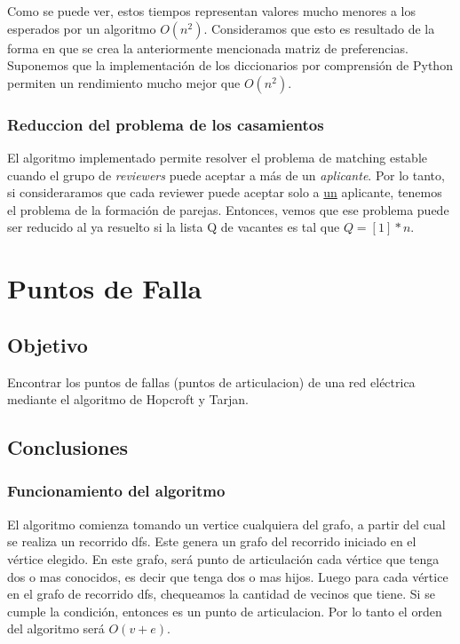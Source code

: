\documentclass{article}
\begin{document}
                Como se puede ver, estos tiempos representan valores mucho menores a
                los esperados por un algoritmo $O(n^2)$. Consideramos que esto es
                resultado de la forma en que se crea la anteriormente mencionada
                matriz de preferencias. Suponemos que la implementación de los
                diccionarios por comprensión de Python permiten un rendimiento mucho
                mejor que $O(n^2)$.
            \subsubsection{Reduccion del problema de los casamientos}
                El algoritmo implementado permite resolver el problema de matching
                estable cuando el grupo de \emph{reviewers} puede aceptar a más de
                un \emph{aplicante}. Por lo tanto, si consideraramos que cada reviewer
                puede aceptar solo a \underline{un} aplicante, tenemos el problema
                de la formación de parejas. Entonces, vemos que ese problema
                puede ser reducido al ya resuelto si la lista Q de vacantes es tal
                que $Q = [1]*n$.

    \section{Puntos de Falla}
        \subsection{Objetivo}
            Encontrar los puntos de fallas (puntos de articulacion) de una red eléctrica
            mediante el algoritmo de Hopcroft y Tarjan.
        \subsection{Conclusiones}
            \subsubsection{Funcionamiento del algoritmo}
                El algoritmo comienza tomando un vertice cualquiera del grafo, a partir
                del cual se realiza un recorrido dfs. Este genera un grafo del recorrido
                iniciado en el vértice elegido. En este grafo, será punto de articulación
                cada vértice que tenga dos o mas conocidos, es decir que tenga dos o mas
                hijos. Luego para cada vértice en el grafo de recorrido dfs, chequeamos
                la cantidad de vecinos que tiene. Si se cumple la condición, entonces es un punto
                de articulacion. Por lo tanto el orden del algoritmo será $O(v+e)$.
\end{document}
